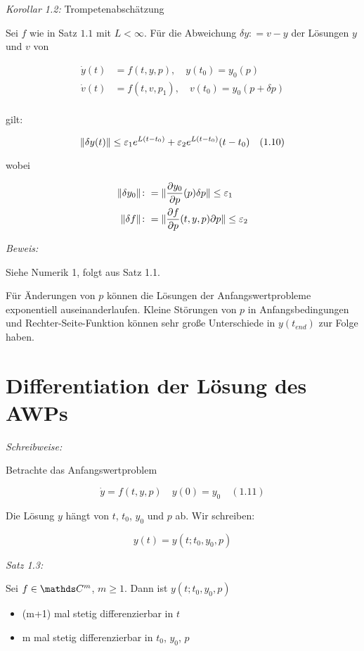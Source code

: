 \emph{Korollar 1.2:} Trompetenabschätzung

Sei $f$ wie in Satz $1.1$ mit $L < \infty$. Für die Abweichung $\delta y \colon= v-y$ der Lösungen $y$ und $v$ von

\begin{align*}
\dot y(t) &= f(t,y,p), \quad y(t_0) = y_0(p) \\
\dot v(t) &= f(t,v,p_1), \quad v(t_0) = y_0(p + \delta p) \\
\end{align*}

gilt:

\[ \|\delta y(t) \| \leq \varepsilon_1 e^{L(t-t_0)} + \varepsilon_2 e^{L(t-t_0)}(t-t_0) \quad (1.10)\]

wobei

\begin{align*}
\|\delta y_0\| \colon&= \| \frac{\partial y_0}{\partial p} (p) \delta p \| \leq \varepsilon_1 \\
\|\delta f\| \colon&= \| \frac{\partial f}{\partial p} (t,y,p) \partial p \| \leq \varepsilon_2
\end{align*}

\emph{Beweis:}

Siehe Numerik 1, folgt aus Satz 1.1.


Für Änderungen von $p$ können die Lösungen der Anfangswertprobleme exponentiell auseinanderlaufen. Kleine Störungen von $p$ in Anfangsbedingungen und Rechter-Seite-Funktion können sehr große Unterschiede in $y(t_{end})$ zur Folge haben.

\section*{Differentiation der Lösung des AWPs}

\emph{Schreibweise:}

Betrachte das Anfangswertproblem

\[ \dot y = f(t,y,p) \quad y(0) = y_0 \quad (1.11) \]

Die Lösung $y$ hängt von $t$, $t_0$, $y_0$ und $p$ ab. Wir schreiben:

\[ y(t) = y(t; t_0, y_0, p) \]

\emph{Satz 1.3:}

Sei $f \in \C^m$, $m \geq 1$. Dann ist $y(t; t_0, y_0, p)$

\begin{itemize}
\item (m+1) mal stetig differenzierbar in $t$
\item m mal stetig differenzierbar in $t_0$, $y_0$, $p$
\end{itemize}

